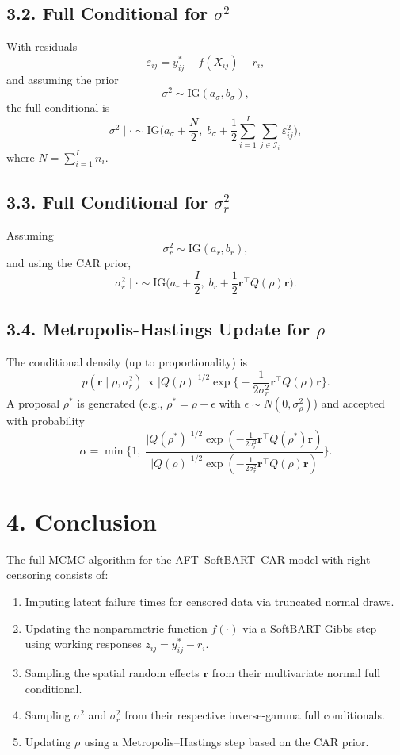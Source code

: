 \documentclass[useAMS,referee]{biom}
\begin{document}
\subsection*{3.2. Full Conditional for $\sigma^2$}

With residuals
\[
\varepsilon_{ij}=y_{ij}^\ast-f(X_{ij})-r_i,
\]
and assuming the prior
\[
\sigma^2 \sim \text{IG}(a_\sigma,b_\sigma),
\]
the full conditional is
\[
\sigma^2\mid\cdot \sim \text{IG}\!\Biggl(a_\sigma+\frac{N}{2},\; b_\sigma+\frac{1}{2}\sum_{i=1}^I\sum_{j\in \mathcal{I}_i}\varepsilon_{ij}^2\Biggr),
\]
where $N=\sum_{i=1}^I n_i$.

\subsection*{3.3. Full Conditional for $\sigma_r^2$}

Assuming
\[
\sigma_r^2 \sim \text{IG}(a_r,b_r),
\]
and using the CAR prior,
\[
\sigma_r^2\mid\cdot \sim \text{IG}\!\Biggl(a_r+\frac{I}{2},\; b_r+\frac{1}{2}\bm{r}^\top Q(\rho)\bm{r}\Biggr).
\]

\subsection*{3.4. Metropolis-Hastings Update for $\rho$}

The conditional density (up to proportionality) is
\[
p(\bm{r}\mid\rho,\sigma_r^2) \propto \vert Q(\rho)\vert^{1/2}\exp\!\Biggl\{-\frac{1}{2\sigma_r^2}\bm{r}^\top Q(\rho)\bm{r}\Biggr\}.
\]
A proposal $\rho^\ast$ is generated (e.g., $\rho^\ast = \rho + \epsilon$ with $\epsilon\sim N(0,\sigma_\rho^2)$) and accepted with probability
\[
\alpha = \min\Biggl\{1,\; \frac{\vert Q(\rho^\ast)\vert^{1/2}\exp\!\left(-\frac{1}{2\sigma_r^2}\bm{r}^\top Q(\rho^\ast)\bm{r}\right)}
{\vert Q(\rho)\vert^{1/2}\exp\!\left(-\frac{1}{2\sigma_r^2}\bm{r}^\top Q(\rho)\bm{r}\right)}\Biggr\}.
\]

\section*{4. Conclusion}

The full MCMC algorithm for the AFT--SoftBART--CAR model with right censoring consists of:
\begin{enumerate}
  \item Imputing latent failure times for censored data via truncated normal draws.
  \item Updating the nonparametric function $f(\cdot)$ via a SoftBART Gibbs step using working responses $z_{ij}=y_{ij}^\ast-r_i$.
  \item Sampling the spatial random effects $\bm{r}$ from their multivariate normal full conditional.
  \item Sampling $\sigma^2$ and $\sigma_r^2$ from their respective inverse-gamma full conditionals.
  \item Updating $\rho$ using a Metropolis--Hastings step based on the CAR prior.
\end{enumerate}
\end{document}
